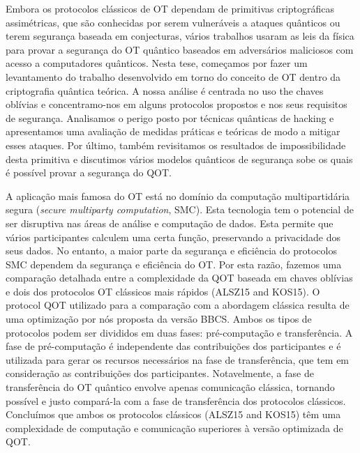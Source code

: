 \documentclass[12pt]{report}
\begin{document}
Embora os protocolos clássicos de OT dependam de primitivas criptográficas assimétricas, que são conhecidas por serem vulneráveis a ataques quânticos ou terem segurança baseada em conjecturas, vários trabalhos usaram as leis da física para provar a segurança do OT quântico baseados em adversários maliciosos com acesso a computadores quânticos. Nesta tese, começamos por fazer um levantamento do trabalho desenvolvido em torno do conceito de OT dentro da criptografia quântica teórica. A nossa análise é centrada no uso the chaves oblívias e concentramo-nos em alguns protocolos propostos e nos seus requisitos de segurança. Analisamos o perigo posto por técnicas quânticas de hacking e apresentamos uma avaliação de medidas práticas e teóricas de modo a mitigar esses ataques. Por último, também revisitamos os resultados de impossibilidade desta primitiva e discutimos vários modelos quânticos de segurança sobe os quais é possível provar a segurança do QOT.

A aplicação mais famosa do OT está no domínio da computação multipartidária segura (\textit{secure multiparty computation}, SMC). Esta tecnologia tem o potencial de ser disruptiva nas áreas de análise e computação de dados. Esta permite que vários participantes calculem uma certa função, preservando a privacidade dos seus dados. No entanto, a maior parte da segurança e eficiência do protocolos SMC dependem da segurança e eficiência do OT. Por esta razão, fazemos uma comparação detalhada entre a complexidade da QOT baseada em chaves oblívias e dois dos protocolos OT clássicos mais rápidos (ALSZ15 and KOS15). O protocol QOT utilizado para a comparação com a abordagem clássica resulta de uma optimização por nós proposta da versão BBCS. Ambos os tipos de protocolos podem ser divididos em duas fases: pré-computação e transferência. A fase de pré-computação é independente das contribuições dos participantes e é utilizada para gerar os recursos necessários na fase de transferência, que tem em consideração as contribuições dos participantes. Notavelmente, a fase de transferência do OT quântico envolve apenas comunicação clássica, tornando possível e justo compará-la com a fase de transferência dos protocolos clássicos. Concluímos que ambos os protocolos clássicos (ALSZ15 and KOS15) têm uma complexidade de computação e comunicação superiores à versão optimizada de QOT.
\end{document}
